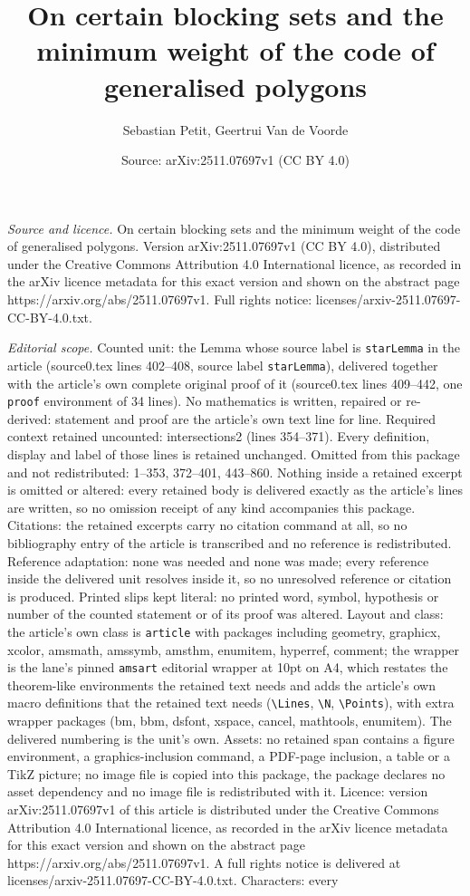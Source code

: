 \documentclass[10pt,a4paper]{amsart}
\title[On certain blocking sets and the minimum weight of the code ]{On certain blocking sets and the minimum weight of the code of generalised polygons}
\author{Sebastian Petit, Geertrui Van de Voorde}
\date{Source: arXiv:2511.07697v1 (CC BY 4.0)}
\begin{document}
\maketitle

\noindent\emph{Source and licence.} On certain blocking sets and the minimum weight of the code of generalised polygons. Version arXiv:2511.07697v1 (CC BY 4.0), distributed under the Creative Commons Attribution 4.0 International licence, as recorded in the arXiv licence metadata for this exact version and shown on the abstract page https://arxiv.org/abs/2511.07697v1. Full rights notice: licenses/arxiv-2511.07697-CC-BY-4.0.txt.\par\smallskip

\noindent\textit{Editorial scope.} Counted unit: the Lemma whose source label is \texttt{starLemma} in the article (source0.tex lines 402--408, source label \texttt{starLemma}), delivered together with the article's own complete original proof of it (source0.tex lines 409--442, one \texttt{proof} environment of 34 lines). No mathematics is written, repaired or re-derived: statement and proof are the article's own text line for line. Required context retained uncounted: intersections2 (lines 354--371). Every definition, display and label of those lines is retained unchanged. Omitted from this package and not redistributed: 1--353, 372--401, 443--860. Nothing inside a retained excerpt is omitted or altered: every retained body is delivered exactly as the article's lines are written, so no omission receipt of any kind accompanies this package. Citations: the retained excerpts carry no citation command at all, so no bibliography entry of the article is transcribed and no reference is redistributed. Reference adaptation: none was needed and none was made; every reference inside the delivered unit resolves inside it, so no unresolved reference or citation is produced. Printed slips kept literal: no printed word, symbol, hypothesis or number of the counted statement or of its proof was altered. Layout and class: the article's own class is \texttt{article} with packages including geometry, graphicx, xcolor, amsmath, amssymb, amsthm, enumitem, hyperref, comment; the wrapper is the lane's pinned \texttt{amsart} editorial wrapper at 10pt on A4, which restates the theorem-like environments the retained text needs and adds the article's own macro definitions that the retained text needs (\texttt{\textbackslash Lines}, \texttt{\textbackslash N}, \texttt{\textbackslash Points}), with extra wrapper packages (bm, bbm, dsfont, xspace, cancel, mathtools, enumitem). The delivered numbering is the unit's own. Assets: no retained span contains a figure environment, a graphics-inclusion command, a PDF-page inclusion, a table or a TikZ picture; no image file is copied into this package, the package declares no asset dependency and no image file is redistributed with it. Licence: version arXiv:2511.07697v1 of this article is distributed under the Creative Commons Attribution 4.0 International licence, as recorded in the arXiv licence metadata for this exact version and shown on the abstract page https://arxiv.org/abs/2511.07697v1. A full rights notice is delivered at licenses/arxiv-2511.07697-CC-BY-4.0.txt. Characters: every 
\end{document}
